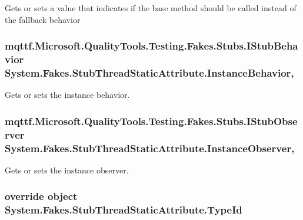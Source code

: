 Gets or sets a value that indicates if the base method should be called instead of the fallback behavior

\hypertarget{class_system_1_1_fakes_1_1_stub_thread_static_attribute_ac0819584fc50b98cf9ea86deda0e5ec7}{
\subsubsection[{Instance\-Behavior}]{\setlength{\rightskip}{0pt plus 5cm}mqttf.\-Microsoft.\-Quality\-Tools.\-Testing.\-Fakes.\-Stubs.\-I\-Stub\-Behavior System.\-Fakes.\-Stub\-Thread\-Static\-Attribute.\-Instance\-Behavior\hspace{0.3cm}{\ttfamily [get]}, {\ttfamily [set]}}}\label{class_system_1_1_fakes_1_1_stub_thread_static_attribute_ac0819584fc50b98cf9ea86deda0e5ec7}


Gets or sets the instance behavior.

\hypertarget{class_system_1_1_fakes_1_1_stub_thread_static_attribute_a13407e463a90c7516baf5099d42d19cb}{
\subsubsection[{Instance\-Observer}]{\setlength{\rightskip}{0pt plus 5cm}mqttf.\-Microsoft.\-Quality\-Tools.\-Testing.\-Fakes.\-Stubs.\-I\-Stub\-Observer System.\-Fakes.\-Stub\-Thread\-Static\-Attribute.\-Instance\-Observer\hspace{0.3cm}{\ttfamily [get]}, {\ttfamily [set]}}}\label{class_system_1_1_fakes_1_1_stub_thread_static_attribute_a13407e463a90c7516baf5099d42d19cb}


Gets or sets the instance observer.

\hypertarget{class_system_1_1_fakes_1_1_stub_thread_static_attribute_a5b8f9b9bb1447f0ae91a10151b84b322}{
\subsubsection[{Type\-Id}]{\setlength{\rightskip}{0pt plus 5cm}override object System.\-Fakes.\-Stub\-Thread\-Static\-Attribute.\-Type\-Id\hspace{0.3cm}{\ttfamily [get]}}}\label{class_system_1_1_fakes_1_1_stub_thread_static_attribute_a5b8f9b9bb1447f0ae91a10151b84b322}


